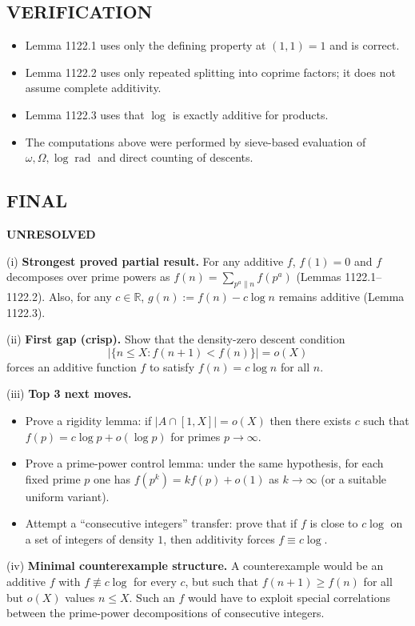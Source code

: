 \subsection*{VERIFICATION}
\begin{itemize}
\item Lemma 1122.1 uses only the defining property at $(1,1)=1$ and is correct.
\item Lemma 1122.2 uses only repeated splitting into coprime factors; it does not assume complete additivity.
\item Lemma 1122.3 uses that $\log$ is exactly additive for products.
\item The computations above were performed by sieve-based evaluation of $\omega,\Omega,\log\operatorname{rad}$ and direct counting of descents.
\end{itemize}

\subsection*{FINAL}
\textbf{UNRESOLVED}

(i) \textbf{Strongest proved partial result.}
For any additive $f$, $f(1)=0$ and $f$ decomposes over prime powers as $f(n)=\sum_{p^a\parallel n} f(p^a)$ (Lemmas 1122.1--1122.2). Also, for any $c\in\mathbb{R}$, $g(n):=f(n)-c\log n$ remains additive (Lemma 1122.3).

(ii) \textbf{First gap (crisp).}
Show that the density-zero descent condition
\[
\lvert\{n\le X: f(n+1)<f(n)\}\rvert=o(X)
\]
forces an additive function $f$ to satisfy $f(n)=c\log n$ for all $n$.

(iii) \textbf{Top 3 next moves.}
\begin{itemize}
\item Prove a rigidity lemma: if $\lvert A\cap[1,X]\rvert=o(X)$ then there exists $c$ such that $f(p)=c\log p+o(\log p)$ for primes $p\to\infty$.
\item Prove a prime-power control lemma: under the same hypothesis, for each fixed prime $p$ one has $f(p^k)=k f(p)+o(1)$ as $k\to\infty$ (or a suitable uniform variant).
\item Attempt a ``consecutive integers'' transfer: prove that if $f$ is close to $c\log$ on a set of integers of density $1$, then additivity forces $f\equiv c\log$.
\end{itemize}

(iv) \textbf{Minimal counterexample structure.}
A counterexample would be an additive $f$ with $f\not\equiv c\log$ for every $c$, but such that $f(n+1)\ge f(n)$ for all but $o(X)$ values $n\le X$. Such an $f$ would have to exploit special correlations between the prime-power decompositions of consecutive integers.



